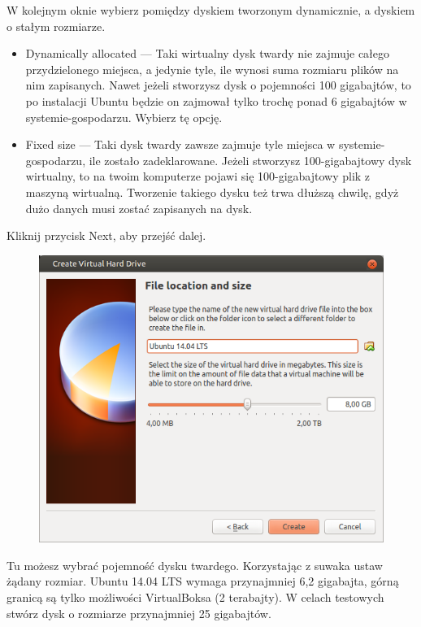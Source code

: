W kolejnym oknie wybierz pomiędzy dyskiem tworzonym dynamicznie, a dyskiem o stałym rozmiarze.
\begin{itemize}
\item \textcolor{ubuntu_orange}{Dynamically allocated} --- Taki wirtualny dysk twardy nie zajmuje całego przydzielonego miejsca, a jedynie tyle, ile wynosi suma rozmiaru plików na nim zapisanych. Nawet jeżeli stworzysz dysk o pojemności 100 gigabajtów, to po instalacji Ubuntu będzie on zajmował tylko trochę ponad 6 gigabajtów w systemie-gospodarzu. Wybierz tę opcję.
\item \textcolor{ubuntu_orange}{Fixed size} --- Taki dysk twardy zawsze zajmuje tyle miejsca w systemie-gospodarzu, ile zostało zadeklarowane. Jeżeli stworzysz 100-gigabajtowy dysk wirtualny, to na twoim komputerze pojawi się 100-gigabajtowy plik z maszyną wirtualną. Tworzenie takiego dysku też trwa dłuższą chwilę, gdyż dużo danych musi zostać zapisanych na dysk.
\end{itemize}
\begin{flushright}
Kliknij przycisk \textcolor{ubuntu_orange}{Next}, aby przejść dalej.
\end{flushright}
\clearpage
\begin{figure}
	\vspace{-10pt}
	\includegraphics[width=\linewidth]{images/virtualbox_wizard6.png}
\end{figure}

Tu możesz wybrać pojemność dysku twardego. Korzystając z suwaka ustaw żądany rozmiar. Ubuntu 14.04 LTS wymaga przynajmniej 6,2 gigabajta, górną granicą są tylko możliwości VirtualBoksa (2 terabajty). W celach testowych stwórz dysk o rozmiarze przynajmniej 25 gigabajtów.

